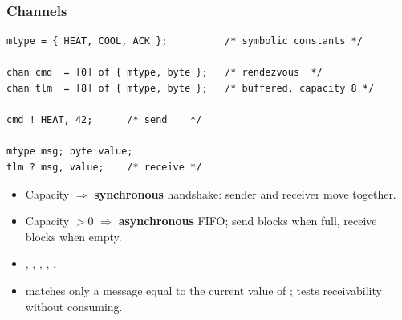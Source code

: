 \begin{frame}[fragile]
  \frametitle{Channels} \small

\begin{lstlisting}[language=promela]
mtype = { HEAT, COOL, ACK };          /* symbolic constants */

chan cmd  = [0] of { mtype, byte };   /* rendezvous  */
chan tlm  = [8] of { mtype, byte };   /* buffered, capacity 8 */

cmd ! HEAT, 42;      /* send    */

mtype msg; byte value;
tlm ? msg, value;    /* receive */
\end{lstlisting}

\pause
\vspace{0.2cm}

\begin{itemize}
\item Capacity \ipromela{[0]} $\Rightarrow$ {\bf synchronous} handshake: sender and
      receiver move together.
\item Capacity $>0$ $\Rightarrow$ {\bf asynchronous} FIFO; send blocks when full,
      receive blocks when empty.
\item {}, , , , .
\item {} matches only a message equal to the current value of ;
       tests receivability without consuming.
\end{itemize}

\end{frame}

